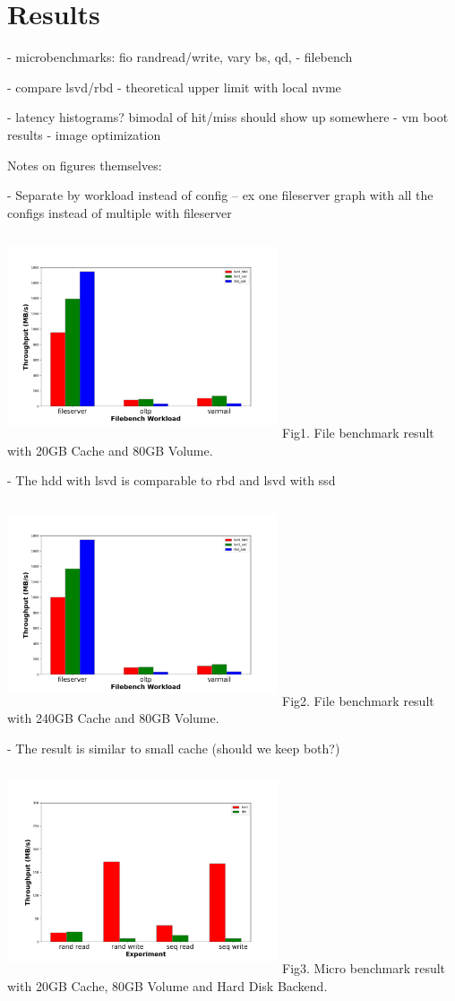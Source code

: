 \section{Results}

- microbenchmarks: fio randread/write, vary bs, qd, 
- filebench

- compare lsvd/rbd
- theoretical upper limit with local nvme

- latency histograms? bimodal of hit/miss should show up somewhere
- vm boot results
- image optimization

Notes on figures themselves:

- Separate by workload instead of config 
  -- ex one fileserver graph with all the configs instead of multiple with fileserver 


\includegraphics[width=8cm, height=6cm]{graphs/filebench_20g.png}
Fig1. File benchmark result with 20GB Cache and 80GB Volume. 

- The hdd with lsvd is comparable to rbd and lsvd with ssd


\includegraphics[width=8cm, height=6cm]{graphs/filebench_240g.png}
Fig2. File benchmark result with 240GB Cache and 80GB Volume.

- The result is similar to small cache (should we keep both?)

\includegraphics[width=8cm, height=6cm]{graphs/request_bw_hdd_20gb.png}
Fig3. Micro benchmark result with 20GB Cache, 80GB Volume and Hard Disk Backend.


